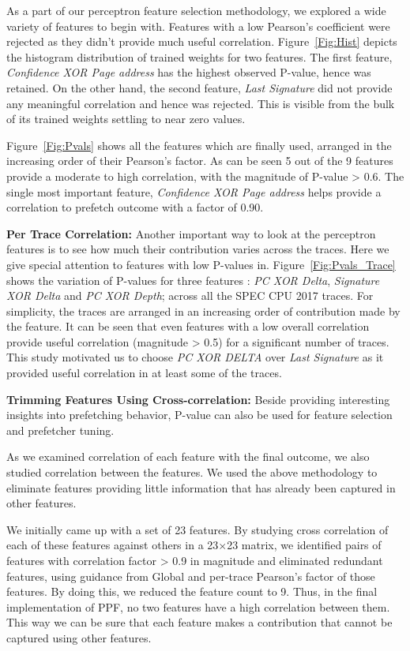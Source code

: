 As a part of our perceptron feature selection methodology, we explored
a wide variety of features to begin with. Features with a low
Pearson's coefficient were rejected as they didn't provide much useful
correlation.  Figure~\ref{Fig:Hist} depicts the histogram distribution
of trained weights for two features.  The first feature,
\textit{Confidence XOR Page address} has the highest observed P-value,
hence was retained.  On the other hand, the second feature,
\textit{Last Signature} did not provide any meaningful correlation and
hence was rejected.  This is visible from the bulk of its trained
weights settling to near zero values.

Figure~\ref{Fig:Pvals} shows all the features which are finally used,
arranged in the increasing order of their Pearson's factor.  As can be
seen 5 out of the 9 features provide a moderate to high correlation,
with the magnitude of P-value > 0.6. The single most important
feature, \textit{Confidence XOR Page address} helps provide
a correlation to prefetch outcome with a factor of 0.90. 

\noindent \textbf{Per Trace Correlation:} Another important way to look
at the perceptron features is to see how much their contribution
varies across the traces. Here we give special attention to features
with low P-values in. Figure~\ref{Fig:Pvals_Trace} shows the variation
of P-values for three features : \textit{PC XOR Delta},
\textit{Signature XOR Delta} and \textit{PC XOR Depth}; across all the
SPEC CPU 2017 traces.  For simplicity, the traces are arranged in an
increasing order of contribution made by the feature.  It can be seen
that even features with a low overall correlation provide useful
correlation (magnitude > 0.5) for a significant number of traces. This
study motivated us to choose \textit{PC XOR DELTA} over \textit{Last
  Signature} as it provided useful correlation in at least some of the
traces.

\noindent \textbf{Trimming Features Using Cross-correlation:} Beside
providing interesting insights into prefetching behavior, P-value can
also be used for feature selection and prefetcher tuning.

As we examined correlation of each feature with the final outcome, we
also studied correlation between the features.  We used the above
methodology to eliminate features providing little information that
has already been captured in other features.

We initially came up {\color{red}with} a set of 23 features.  By studying cross
correlation of each of these features against others in a 23$\times$23
matrix, we identified pairs of features with correlation factor > 0.9
in magnitude and eliminated redundant features, using guidance from
Global and per-trace Pearson's factor of those features.  By doing
this, we reduced the feature count to 9.  Thus, in the final
implementation of PPF, no two features have a high correlation between
them. This way we can be sure that each feature makes a contribution
that cannot be captured using other features.

